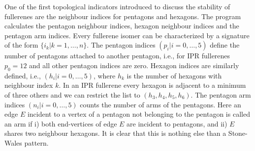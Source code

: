 \documentclass[article,a4paper,twoside]{memoir}
\begin{document}
One of the first topological indicators introduced to discuss the stability of fullerenes
are the neighbour indices for pentagons and hexagons.  The program calculates the
pentagon neighbour indices,\cite{Atlas,Albertazzi} hexagon neighbour indices and
the pentagon arm indices.\cite{Reti}  Every fullerene isomer can be characterized
by a signature of the form $\{i_k | k=1, \dots, n\}$.  The pentagon indices $(p_i | i=0, \dots, 5)$
define the number of pentagons attached to another pentagon, i.e., for IPR fullerenes
$p_0 = 12$ and all other pentagon indices are zero.  Hexagon indices are similarly
defined, i.e., $(h_i | i=0, \dots, 5)$, where $h_k$ is the number of hexagons with
neighbour index $k$.  In an IPR fullerene every hexagon is adjacent to a minimum
of three others and we can restrict the list to $(h_3, h_4, h_5, h_6)$.  The pentagon
arm indices $(n_i | i=0, \dots, 5)$ counts the number of arms of the pentagons.  Here
an edge $E$ incident to a vertex of a pentagon not belonging to the pentagon is called
an arm if i) both end-vertices of edge $E$ are incident to pentagons, and ii) $E$ shares
two neighbour hexagons.\cite{Reti}  It is clear that this is nothing else than a
Stone-Wales pattern.
\end{document}
